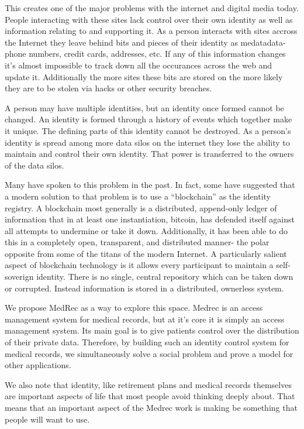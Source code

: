 \documentclass[a4paper]{article}
\begin{document}
This creates one of the major problems with the internet and digital media today. People interacting with these sites lack control over their own identity as well as information relating to and supporting it. As a person interacts with sites accross the Internet they leave behind bits and pieces of their identity as medatadata- phone numbers, credit cards, addresses, etc.
If any of this information changes it's almost impossible to track down all the occurances across the web and update it. Additionally the more sites these bits are stored on the more likely they are to be stolen via hacks or other security breaches.

A person may have multiple identities, but an identity once formed cannot be changed. An identity is formed through a history of events which together make it unique. The defining parts of this identity cannot be destroyed. As a person's identity is spread among more data silos on the internet they lose the ability to maintain and control their own identity. That power is transferred to the owners of the data silos.

Many have spoken to this problem in the past. In fact, some have suggested that a modern solution to that problem is to use a “blockchain” as the identity registry.  A blockchain most generally is a distributed, append-only ledger of information that in at least one instantiation, bitcoin, has defended itself against all attempts to undermine or take it down. Additionally, it has been able to do this in a completely open, transparent, and distributed manner- the polar opposite from some of the titans of the modern Internet. A particularly salient aspect of blockchain technology is it allows every participant to maintain a self-soverign identity. There is no single, central repository which can be taken down or corrupted. Instead information is stored in a distributed, ownerless system.

We propose MedRec as a way to explore this space.  Medrec is an access management system for medical records, but at it's core it is simply an access management system. Its main goal is to give patients control over the distribution of their private data. Therefore, by building such an identity control system for medical records, we simultaneously solve a social problem and prove a model for other applications.

We also note that identity, like retirement plans and medical records themselves are important aspects of life that most people avoid thinking deeply about. That means that an important aspect of the Medrec work is making be something that people will want to use.
\end{document}
